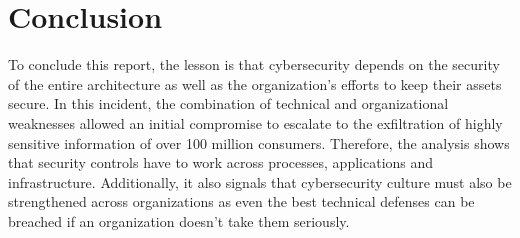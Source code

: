 \chapter{Conclusion}

To conclude this report, the lesson is that cybersecurity depends on the security of the entire architecture as well as the organization's efforts to keep their assets secure.
\newline
In this incident, the combination of technical and organizational weaknesses allowed an initial compromise to escalate to the exfiltration of highly sensitive information of over 100 million consumers.
\newline
Therefore, the analysis shows that security controls have to work across processes, applications and infrastructure. Additionally, it also signals that cybersecurity culture must also be strengthened across organizations as even the best technical defenses can be breached if an organization doesn't take them seriously. 